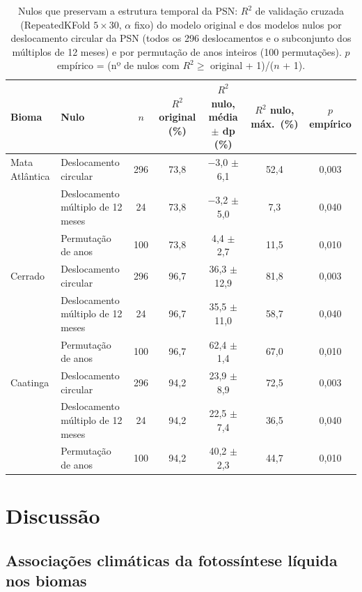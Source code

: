 \documentclass[a4paper,fleqn]{cas-sc}
\begin{document}
\begin{table}[htbp]
\caption{Nulos que preservam a estrutura temporal da PSN: $R^2$ de validação cruzada (RepeatedKFold $5 \times 30$, $\alpha$ fixo) do modelo original e dos modelos nulos por deslocamento circular da PSN (todos os 296 deslocamentos e o subconjunto dos múltiplos de 12 meses) e por permutação de anos inteiros (100 permutações). $p$ empírico = (nº de nulos com $R^2 \ge$ original + 1)/($n$ + 1).}\label{tbl:nulls}
\footnotesize
\begin{tabular*}{\tblwidth}{@{}LLCCCCC@{}}
\toprule
Bioma & Nulo & $n$ & $R^2$ original (\%) & $R^2$ nulo, média $\pm$ dp (\%) & $R^2$ nulo, máx.\ (\%) & $p$ empírico \\
\midrule
Mata Atlântica & Deslocamento circular & 296 & 73,8 & $-$3,0 $\pm$ 6,1 & 52,4 & 0,003 \\
 & Deslocamento múltiplo de 12 meses & 24 & 73,8 & $-$3,2 $\pm$ 5,0 & 7,3 & 0,040 \\
 & Permutação de anos & 100 & 73,8 & 4,4 $\pm$ 2,7 & 11,5 & 0,010 \\
Cerrado & Deslocamento circular & 296 & 96,7 & 36,3 $\pm$ 12,9 & 81,8 & 0,003 \\
 & Deslocamento múltiplo de 12 meses & 24 & 96,7 & 35,5 $\pm$ 11,0 & 58,7 & 0,040 \\
 & Permutação de anos & 100 & 96,7 & 62,4 $\pm$ 1,4 & 67,0 & 0,010 \\
Caatinga & Deslocamento circular & 296 & 94,2 & 23,9 $\pm$ 8,9 & 72,5 & 0,003 \\
 & Deslocamento múltiplo de 12 meses & 24 & 94,2 & 22,5 $\pm$ 7,4 & 36,5 & 0,040 \\
 & Permutação de anos & 100 & 94,2 & 40,2 $\pm$ 2,3 & 44,7 & 0,010 \\
\bottomrule
\end{tabular*}
\end{table}

\section{Discussão}\label{sec:discussion}

\subsection{Associações climáticas da fotossíntese líquida nos biomas}
\end{document}
